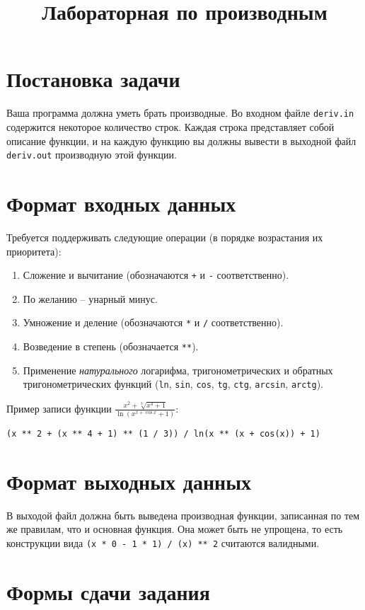 \documentclass[russian]{article}
\title{Лабораторная по производным}
\begin{document}
\maketitle

\section{Постановка задачи}

Ваша программа должна уметь брать производные. Во входном файле \texttt{deriv.in} содержится некоторое количество строк. Каждая строка представляет собой описание функции, и на каждую функцию вы должны вывести в выходной файл \texttt{deriv.out} производную этой функции.

\section{Формат входных данных}
Требуется поддерживать следующие операции (в порядке возрастания их приоритета):
\begin{enumerate}
 \item Сложение и вычитание (обозначаются \texttt{+} и \texttt{-} соответственно).
 \item По желанию -- унарный минус.
 \item Умножение и деление  (обозначаются \texttt{*} и \texttt{/} соответственно).
 \item Возведение в степень (обозначается \texttt{**}).
 \item Применение \textit{натурального} логарифма, тригонометрических и обратных тригонометрических функций (\texttt{ln}, \texttt{sin}, \texttt{cos}, \texttt{tg}, \texttt{ctg}, \texttt{arcsin}, \texttt{arctg}).
\end{enumerate}

Пример записи функции $\frac{x^2 + \sqrt[3]{x^4 + 1}}{\ln (x^{x + \cos x} + 1)}$:

\texttt{(x ** 2 + (x ** 4 + 1) ** (1 / 3)) / ln(x ** (x + cos(x)) + 1)} 

\section{Формат выходных данных}
В выходой файл должна быть выведена производная функции, записанная по тем же правилам, что и основная функция. Она может быть не упрощена, то есть конструкции вида \texttt{(x * 0 - 1 * 1) / (x) ** 2} считаются валидными.

\section{Формы сдачи задания}
\end{document}
